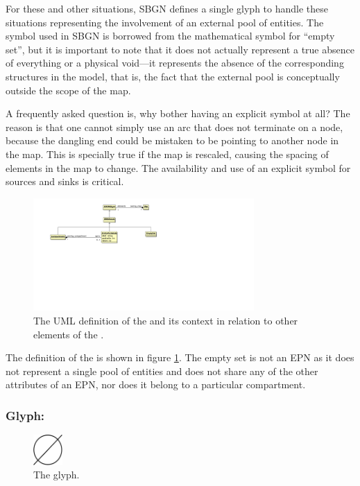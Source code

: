 For these and other situations, SBGN defines a single glyph to handle
these situations representing the involvement of an external pool of entities.  The symbol
used in SBGN is borrowed from the mathematical symbol for ``empty set'',
but it is important to note that it does not actually represent a true
absence of everything or a physical void---it represents the absence of the
corresponding structures in the model, that is, the fact that the
external pool is conceptually outside the scope of the map.

A frequently asked question is, why bother having an explicit symbol at
all?  The reason is that one cannot simply use an arc that does not
terminate on a node, because the dangling end could be mistaken to be
pointing to another node in the map.  This is specially true if the
map is rescaled, causing the spacing of elements in the map to
change.  The availability and use of an explicit symbol for sources and
sinks is critical.

\begin{figure}[htb]
  \centering
  \includegraphics[width=0.75\textwidth]{images/emptysetuml}
  \caption{The UML definition of the  and its context
    in relation to other elements of the \PDl.}
  \label{fig:emptysetuml}
\end{figure}


The definition of the  is shown in figure
\ref{fig:emptysetuml}. The empty set is not an EPN as it does not
represent a single pool of entities and does not share any of the
other attributes of an EPN, nor does it belong to a particular
compartment.

\subsubsection{Glyph: }

\begin{figure}[H]
  \centering
  \includegraphics[width = 0.1\textwidth]{images/sourceSink}
  \caption{The  glyph.}
  \label{fig:sourceSink}
\end{figure}

